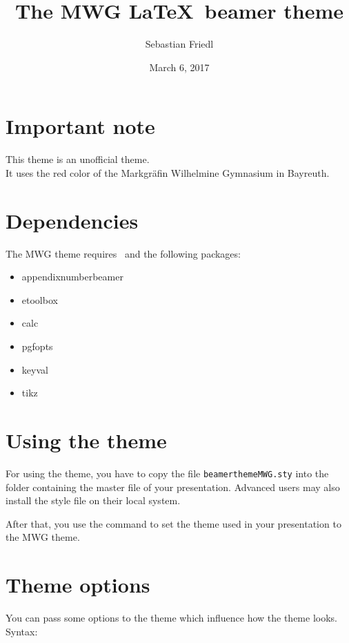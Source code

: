 \documentclass[12pt,a4paper]{scrartcl}
\title{The MWG \LaTeX\ beamer theme}
\author{Sebastian Friedl}
\date{March 6, 2017}
\begin{document}
	\maketitle
	\thispagestyle{empty}
	
	
	\section*{Important note}
	This theme is an unofficial theme. \\
	It uses the red color of the Markgräfin Wilhelmine Gymnasium in Bayreuth.
	
		
	\section*{Dependencies}
	The MWG theme requires \LaTeXe\ and the following packages:
	\begin{itemize} \ttfamily
		\item appendixnumberbeamer
		\item etoolbox
		\item calc
		\item pgfopts
		\item keyval
		\item tikz
	\end{itemize}
	
	
	\section{Using the theme}
	For using the theme, you have to copy the file \texttt{beamerthemeMWG.sty} into the folder containing the master file of your presentation. Advanced users may also install the style file on their local system. \par
	After that, you use the command \texttt{} to set the theme used in your presentation to the MWG theme.

	
	\section{Theme options}
	You can pass some options to the theme which influence how the theme looks. \\
	Syntax: \ \ \texttt{} \\\vspace{0.5ex}
	
\end{document}
